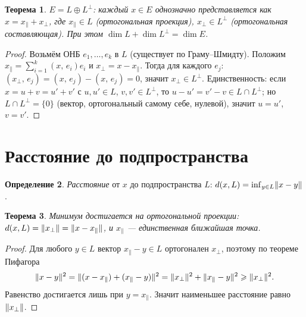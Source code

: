 \documentclass[11pt,a4paper]{article}
\theoremstyle{definition}
\newtheorem{definition}{Определение}[section]
\theoremstyle{plain}
\newtheorem{theorem}[definition]{Теорема}
\renewcommand{\ge}{\geqslant}
\newcommand{\scal}[2]{\left( #1,\,#2\right)}
\DeclarePairedDelimiter{\norm}{\lVert}{\rVert}
\begin{document}
\begin{theorem}
$E=L\oplus L^\perp$: каждый $x\in E$ однозначно представляется как $x=x_\parallel+x_\perp$, где
$x_\parallel\in L$ (\emph{ортогональная проекция}), $x_\perp\in L^\perp$ (\emph{ортогональная
составляющая}). При этом $\dim L+\dim L^\perp=\dim E$.
\end{theorem}

\begin{proof}
Возьмём ОНБ $e_1,\dots,e_k$ в $L$ (существует по Граму–Шмидту). Положим
$x_\parallel=\sum_{i=1}^k\scal x{e_i}e_i$ и $x_\perp=x-x_\parallel$. Тогда для каждого $e_j$:
$\scal{x_\perp}{e_j}=\scal x{e_j}-\scal x{e_j}=0$, значит $x_\perp\in L^\perp$. Единственность: если
$x=u+v=u'+v'$ с $u,u'\in L$, $v,v'\in L^\perp$, то $u-u'=v'-v\in L\cap L^\perp$; но
$L\cap L^\perp=\{0\}$ (вектор, ортогональный самому себе, нулевой), значит $u=u'$, $v=v'$.
\end{proof}

\section{Расстояние до подпространства}

\begin{definition}
\emph{Расстояние} от $x$ до подпространства $L$: $d(x,L)=\inf_{y\in L}\norm{x-y}$.
\end{definition}

\begin{theorem}
Минимум достигается на ортогональной проекции: $d(x,L)=\norm{x_\perp}=\norm{x-x_\parallel}$, и
$x_\parallel$ — единственная ближайшая точка.
\end{theorem}

\begin{proof}
Для любого $y\in L$ вектор $x_\parallel-y\in L$ ортогонален $x_\perp$, поэтому по теореме Пифагора
\[
  \norm{x-y}^2=\norm{(x-x_\parallel)+(x_\parallel-y)}^2=\norm{x_\perp}^2+\norm{x_\parallel-y}^2
  \ge\norm{x_\perp}^2 .
\]
Равенство достигается лишь при $y=x_\parallel$. Значит наименьшее расстояние равно
$\norm{x_\perp}$.
\end{proof}
\end{document}
